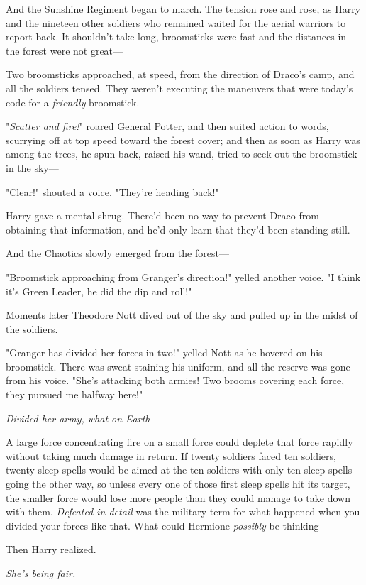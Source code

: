 And the Sunshine Regiment began to march.
\sbreak
The tension rose and rose, as Harry and the nineteen other soldiers who
remained waited for the aerial warriors to report back. It shouldn't take long,
broomsticks were fast and the distances in the forest were not great---

Two broomsticks approached, at speed, from the direction of Draco's camp, and
all the soldiers tensed. They weren't executing the maneuvers that were today's
code for a \emph{friendly} broomstick.

"\emph{Scatter and fire!}" roared General Potter, and then suited action to
words, scurrying off at top speed toward the forest cover; and then as soon as
Harry was among the trees, he spun back, raised his wand, tried to seek out the
broomstick in the sky---

"Clear!" shouted a voice. "They're heading back!"

Harry gave a mental shrug. There'd been no way to prevent Draco from obtaining
that information, and he'd only learn that they'd been standing still.

And the Chaotics slowly emerged from the forest---

"Broomstick approaching from Granger's direction!" yelled another voice. "I
think it's Green Leader, he did the dip and roll!"

Moments later Theodore Nott dived out of the sky and pulled up in the midst of
the soldiers.

"Granger has divided her forces in two!" yelled Nott as he hovered on his
broomstick. There was sweat staining his uniform, and all the reserve was gone
from his voice. "She's attacking both armies! Two brooms covering each force,
they pursued me halfway here!"

\emph{Divided her army, what on Earth---}

A large force concentrating fire on a small force could deplete that force
rapidly without taking much damage in return. If twenty soldiers faced ten
soldiers, twenty sleep spells would be aimed at the ten soldiers with only ten
sleep spells going the other way, so unless every one of those first sleep
spells hit its target, the smaller force would lose more people than they could
manage to take down with them. \emph{Defeated in detail} was the military term
for what happened when you divided your forces like that. What could Hermione
\emph{possibly} be thinking{\el}

Then Harry realized.

\emph{She's being fair.}

